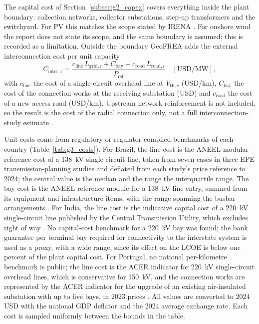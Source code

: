 The capital cost of Section~\ref{subsec:g2_capex} covers everything
inside the plant boundary: collection networks, collector substations,
step-up transformers and the switchyard. For PV this matches the scope
stated by IRENA \cite{irena2025costs2024}. For onshore wind the report
does not state its scope, and the same boundary is assumed; this is
recorded as a limitation. Outside the boundary GeoFREA adds the external
interconnection cost per unit capacity
\begin{equation}
    C_{\mathrm{inter},i} =
    \frac{c_{\mathrm{line}}\,L_{\mathrm{grid},i}
          + C_{\mathrm{bay}}
          + c_{\mathrm{road}}\,L_{\mathrm{road},i}}{P_{\mathrm{ref}}}
    \quad [\mathrm{USD/MW}],
    \label{eq:g3_inter}
\end{equation}
with $c_{\mathrm{line}}$ the cost of a single-circuit overhead line at
$V_{\mathrm{th},c}$ (USD/km), $C_{\mathrm{bay}}$ the cost of the
connection works at the receiving substation (USD) and
$c_{\mathrm{road}}$ the cost of a new access road (USD/km). Upstream
network reinforcement is not included, so the result is the cost of the
radial connection only, not a full interconnection-study estimate
\cite{seel2023}.

Unit costs come from regulatory or regulator-compiled benchmarks of each
country (Table~\ref{tab:g3_costs}). For Brazil, the line cost is the
ANEEL modular reference cost of a 138~kV single-circuit line, taken from
seven cases in three EPE transmission-planning studies and deflated from
each study's price reference to 2024; the central value is the median and
the range the interquartile range. The bay cost is the ANEEL reference
module for a 138~kV line entry, summed from its equipment and
infrastructure items, with the range spanning the busbar arrangements
\cite{aneelBPR}. For India, the line cost is the indicative capital cost
of a 220~kV single-circuit line published by the Central Transmission
Utility, which excludes right of way \cite{ctuilIndicative2025}. No
capital-cost benchmark for a 220~kV bay was found; the bank guarantee per
terminal bay required for connectivity to the interstate system
\cite{cerc2022gna} is used as a proxy, with a wide range, since its effect
on the LCOE is below one percent of the plant capital cost. For
Portugal, no national per-kilometre benchmark is public; the line cost is
the ACER indicator for 220~kV single-circuit overhead lines, which is
conservative for 150~kV, and the connection works are represented by the
ACER indicator for the upgrade of an existing air-insulated substation
with up to five bays, in 2023 prices \cite{acer2023uic}. All values are
converted to 2024 USD with the national GDP deflator and the 2024 average
exchange rate. Each cost is sampled uniformly between the bounds in the
table.

